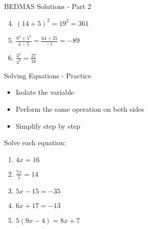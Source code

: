 \documentclass[aspectratio=169]{beamer}
\begin{document}
\begin{frame}{BEDMAS Solutions - Part 2}
    \begin{tcolorbox}[colback=lightgray,colframe=accent,title=Solutions]
        \begin{enumerate}
            \setcounter{enumi}{3}
            \item $(14 + 5)^2 = 19^2 = 361$
            \item $\frac{8^2 + 5^2}{4 - 5} = \frac{64 + 25}{-1} = -89$
            \item $\frac{3^3}{4^2} = \frac{27}{16}$
        \end{enumerate}
    \end{tcolorbox}
\end{frame}

\begin{frame}{Solving Equations - Practice}
    \begin{tcolorbox}[colback=lightgray,colframe=primary,title=Key Steps]
        \begin{itemize}
            \item Isolate the variable
            \item Perform the same operation on both sides
            \item Simplify step by step
        \end{itemize}
    \end{tcolorbox}
    
    \begin{tcolorbox}[colback=lightgray,colframe=primary,title=Practice Problems]
        Solve each equation:
        \begin{enumerate}
            \item $4x = 16$
            \item $\frac{7x}{5} = 14$
            \item $5x - 15 = -35$
            \item $6x + 17 = -13$
            \item $5(9x - 4) = 8x + 7$
        \end{enumerate}
    \end{tcolorbox}
\end{frame}
\end{document}
